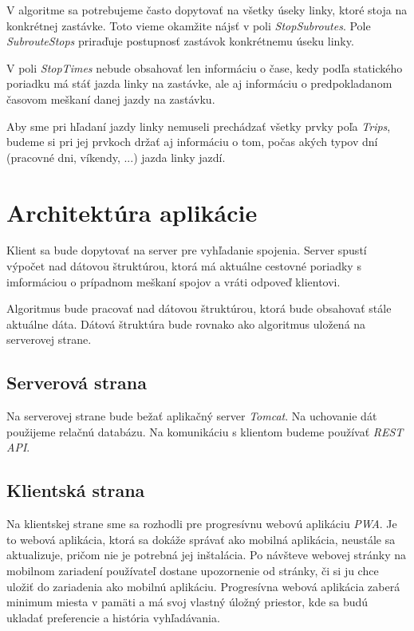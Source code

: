 V algoritme sa potrebujeme často dopytovať na všetky úseky linky, ktoré stoja na konkrétnej zastávke. Toto vieme okamžite nájsť v poli \textit{StopSubroutes}. Pole \textit{SubrouteStops} priraďuje postupnosť zastávok konkrétnemu úseku linky. 

V poli \textit{StopTimes} nebude obsahovať len informáciu o čase, kedy podľa statického poriadku má stáť jazda linky na zastávke, ale aj informáciu o predpokladanom časovom meškaní danej jazdy na zastávku.

Aby sme pri hľadaní jazdy linky nemuseli prechádzať všetky prvky poľa \textit{Trips}, budeme si pri jej prvkoch držať aj informáciu o tom, počas akých typov dní (pracovné dni, víkendy, ...) jazda linky jazdí. 


\section{Architektúra aplikácie}

Klient sa bude dopytovať na server pre vyhľadanie spojenia. Server spustí výpočet nad dátovou štruktúrou, ktorá má aktuálne cestovné poriadky s imformáciou o prípadnom meškaní spojov a vráti odpoveď klientovi.

Algoritmus bude pracovať nad dátovou štruktúrou, ktorá bude obsahovať stále aktuálne dáta. Dátová štruktúra bude rovnako ako algoritmus uložená na serverovej strane. 

\subsection{Serverová strana}
Na serverovej strane bude bežať aplikačný server \textit{Tomcat}. Na uchovanie dát použijeme relačnú databázu. Na komunikáciu s klientom budeme používať \textit{REST API}.

\subsection{Klientská strana}
Na klientskej strane sme sa rozhodli pre progresívnu webovú aplikáciu \textit{PWA}. Je to webová aplikácia, ktorá sa dokáže správať ako mobilná aplikácia, neustále sa aktualizuje, pričom nie je potrebná jej inštalácia. Po návšteve webovej stránky na mobilnom zariadení používateľ dostane upozornenie od stránky, či si ju chce uložiť do zariadenia ako mobilnú aplikáciu. Progresívna webová aplikácia zaberá minimum miesta v pamäti a má svoj vlastný úložný priestor, kde sa budú ukladať preferencie a história vyhľadávania.

